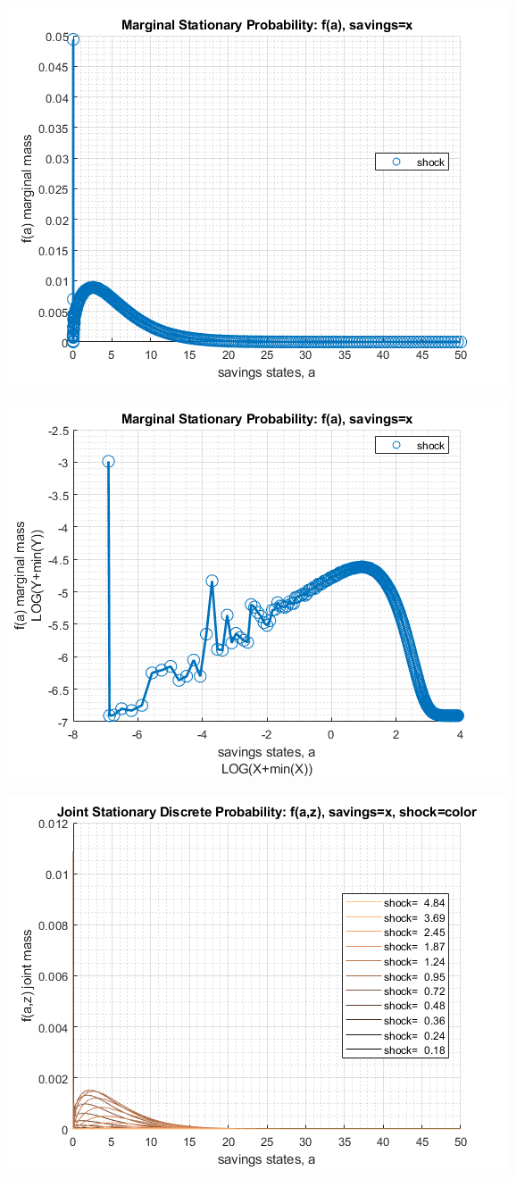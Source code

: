 \documentclass[
]{book}
\begin{document}
\includegraphics[width=5.20833in,height=\textheight]{img/fx_ds_az_cts_loop_images/figure_7.png}

\includegraphics[width=5.20833in,height=\textheight]{img/fx_ds_az_cts_loop_images/figure_8.png}

\includegraphics[width=5.20833in,height=\textheight]{img/fx_ds_az_cts_loop_images/figure_9.png}
\end{document}

